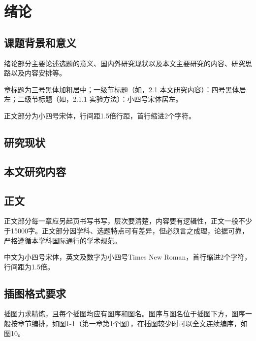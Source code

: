\documentclass{seuthesis-2022}
\title{}
\author{}
\date{}
\begin{document}
\maketitle

\makedeclaration

\begin{abstract}[zh]
    
\end{abstract}

\begin{abstract}[en]
    
\end{abstract}

\tableofcontents

\section{绪论}
\subsection{课题背景和意义}
绪论部分主要论述选题的意义、国内外研究现状以及本文主要研究的内容、研究思路以及内容安排等。

章标题为三号黑体加粗居中；一级节标题（如，2.1 本文研究内容）：四号黑体居左；二级节标题（如，2.1.1 实验方法）：小四号宋体居左。

正文部分为小四号宋体，行间距1.5倍行距，首行缩进2个字符。

\subsection{研究现状}

\subsection{本文研究内容}

\subsection{正文}
正文部分每一章应另起页书写书写，层次要清楚，内容要有逻辑性，正文一般不少于15000字。正文部分因学科、选题特点可有差异，但必须言之成理，论据可靠，严格遵循本学科国际通行的学术规范。

中文为小四号宋体，英文及数字为小四号Times New Roman，首行缩进2个字符，行间距为1.5倍。

\subsection{插图格式要求}
插图力求精炼，且每个插图均应有图序和图名。图序与图名位于插图下方，图序一般按章节编排，如图1-1（第一章第1个图），在插图较少时可以全文连续编序，如图10。
\end{document}
